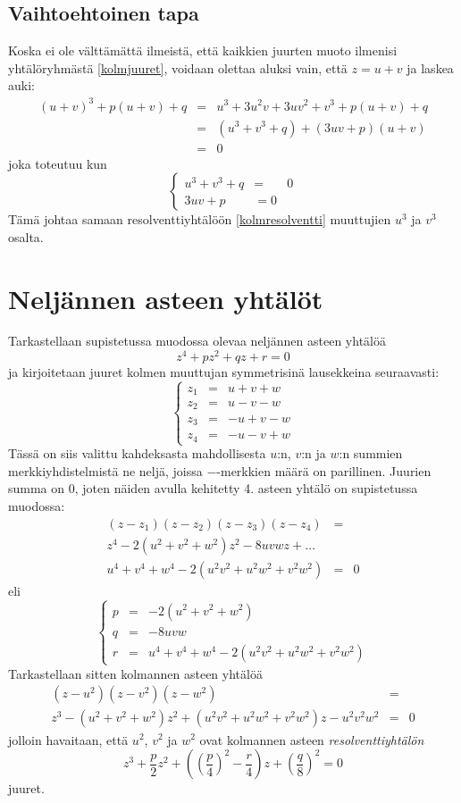 \documentclass[a4paper]{article}
\begin{document}
\subsection{Vaihtoehtoinen tapa}
Koska ei ole välttämättä ilmeistä, että kaikkien juurten muoto ilmenisi yhtälöryhmästä \ref{kolmjuuret}, voidaan olettaa aluksi vain, että $z=u+v$ ja laskea auki:
\begin{eqnarray*}
  (u+v)^3+p(u+v)+q & = & u^3+3u^2 v+3uv^2+v^3+p(u+v)+q \\
  & = & (u^3+v^3+q) + (3uv+p)(u+v) \\
  & = & 0
\end{eqnarray*}
joka toteutuu kun
$$
\left\{
\begin{array}{ccc}
  u^3+v^3+q & = & 0 \\
  3uv+p & = 0
\end{array}
\right.
$$
Tämä johtaa samaan resolventtiyhtälöön \ref{kolmresolventti} muuttujien $u^3$ ja $v^3$ osalta.
\section{Neljännen asteen yhtälöt}
Tarkastellaan supistetussa muodossa olevaa neljännen asteen yhtälöä
$$
z^4+pz^2+qz+r=0
$$
ja kirjoitetaan juuret kolmen muuttujan symmetrisinä lausekkeina seuraavasti:
\begin{equation}
  \label{neljannenjuuret}
\left\{
\begin{array}{ccc}
  z_1 & = & u+v+w \\
  z_2 & = & u-v-w \\
  z_3 & = & -u+v-w \\
  z_4 & = & -u-v+w
\end{array}
\right.
\end{equation}
Tässä on siis valittu kahdeksasta mahdollisesta $u$:n, $v$:n ja $w$:n summien merkkiyhdistelmistä ne neljä, joissa $-$-merkkien määrä on parillinen. Juurien summa on $0$, joten näiden avulla kehitetty 4. asteen yhtälö on supistetussa muodossa:
\begin{eqnarray*}
  (z-z_1)(z-z_2)(z-z_3)(z-z_4) & = & \\
  z^4-2(u^2+v^2+w^2)z^2-8uvwz+\ldots \\
  u^4+v^4+w^4-2(u^2 v^2+u^2 w^2+v^2 w^2) & = & 0
\end{eqnarray*}
eli
$$
\left\{
\begin{array}{ccc}
  p & = & -2(u^2+v^2+w^2) \\
  q & = & -8uvw \\
  r & = & u^4+v^4+w^4-2(u^2 v^2+u^2 w^2+v^2 w^2)
\end{array}
\right.
$$
Tarkastellaan sitten kolmannen asteen yhtälöä
\begin{eqnarray*}
  (z-u^2)(z-v^2)(z-w^2) & = & \\
  z^3-(u^2+v^2+w^2)z^2+(u^2 v^2+u^2 w^2+v^2 w^2)z-u^2 v^2 w^2 & = & 0
\end{eqnarray*}
jolloin havaitaan, että $u^2$, $v^2$ ja $w^2$ ovat kolmannen asteen \emph{resolventtiyhtälön}
\begin{equation}
  \label{kolmannenasteenresolventti}
z^3+\frac{p}{2}z^2+\left(\left(\frac{p}{4}\right)^2-\frac{r}{4}\right)z+\left(\frac{q}{8}\right)^2=0
\end{equation}
juuret.
\end{document}
